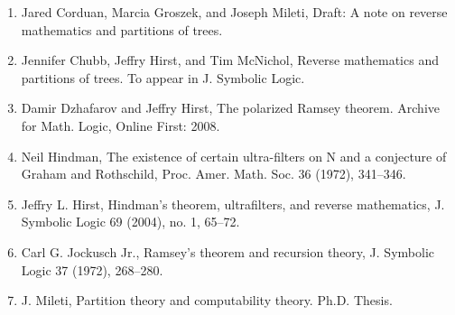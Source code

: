 \documentclass[a4paper,11pt]{article}
\begin{document}
\begin{enumerate}
\item Jared Corduan, Marcia Groszek, and Joseph Mileti, Draft: A note on reverse mathematics
and partitions of trees.

\item Jennifer Chubb, Jeffry Hirst, and Tim McNichol, Reverse mathematics and partitions of
trees. To appear in J. Symbolic Logic.

\item Damir Dzhafarov and Jeffry Hirst, The polarized Ramsey theorem. Archive for Math. Logic,
Online First: 2008.

\item Neil Hindman, The existence of certain ultra-filters on N and a conjecture of Graham and
Rothschild, Proc. Amer. Math. Soc. 36 (1972), 341–346.

\item Jeffry L. Hirst, Hindman’s theorem, ultrafilters, and reverse mathematics, J. Symbolic Logic
69 (2004), no. 1, 65–72.

\item Carl G. Jockusch Jr., Ramsey’s theorem and recursion theory, J. Symbolic Logic 37 (1972),
268–280.

\item J. Mileti, Partition theory and computability theory. Ph.D. Thesis.


\end{enumerate}
\end{document}
